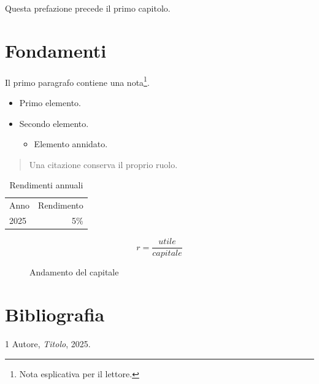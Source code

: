 \documentclass{book}
\begin{document}
Questa prefazione precede il primo capitolo.

\chapter{Fondamenti}

Il primo paragrafo contiene una nota\footnote{Nota esplicativa per il lettore.}.

\begin{itemize}
\item Primo elemento.
\item Secondo elemento.
  \begin{itemize}
  \item Elemento annidato.
  \end{itemize}
\end{itemize}

\begin{quote}
Una citazione conserva il proprio ruolo.
\end{quote}

\begin{table}
\caption{Rendimenti annuali}
\begin{tabular}{lr}
Anno & Rendimento \\
2025 & 5\% \\
\end{tabular}
\end{table}

\[
r = \frac{utile}{capitale}
\]

\begin{figure}
\caption{Andamento del capitale}
\end{figure}



\chapter{Bibliografia}

\begin{thebibliography}{1}
 Autore, \emph{Titolo}, 2025.
\end{thebibliography}
\end{document}
